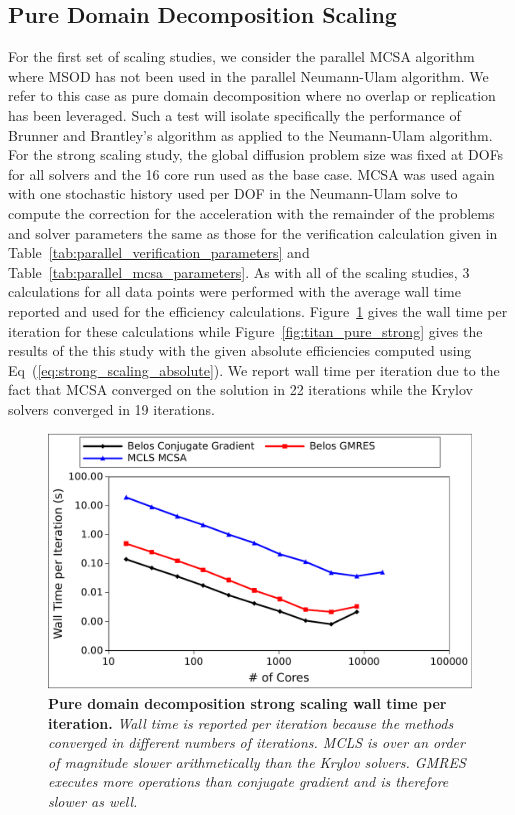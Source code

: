 \clearpage

\subsection{Pure Domain Decomposition Scaling}
\label{subsec:pure_domain_decomp}

For the first set of scaling studies, we consider the parallel MCSA
algorithm where MSOD has not been used in the parallel Neumann-Ulam
algorithm. We refer to this case as pure domain decomposition where no
overlap or replication has been leveraged. Such a test will isolate
specifically the performance of Brunner and Brantley's algorithm as
applied to the Neumann-Ulam algorithm. For the strong scaling study,
the global diffusion problem size was fixed at  DOFs for
all solvers and the 16 core run used as the base case. MCSA was used
again with one stochastic history used per DOF in the Neumann-Ulam
solve to compute the correction for the acceleration with the
remainder of the problems and solver parameters the same as those for
the verification calculation given in
Table~\ref{tab:parallel_verification_parameters} and
Table~\ref{tab:parallel_mcsa_parameters}. As with all of the scaling
studies, 3 calculations for all data points were performed with the
average wall time reported and used for the efficiency
calculations. Figure~\ref{fig:titan_pure_strong_time} gives the wall
time per iteration for these calculations while
Figure~\ref{fig:titan_pure_strong} gives the results of the this study
with the given absolute efficiencies computed using
Eq~(\ref{eq:strong_scaling_absolute}). We report wall time per
iteration due to the fact that MCSA converged on the solution in 22
iterations while the Krylov solvers converged in 19 iterations.

\begin{figure}[t!]
  \begin{center}
    \includegraphics[width=6in]{chapters/parallel_mc/titan_pure_strong_time.pdf}
  \end{center}
  \caption{\textbf{Pure domain decomposition strong scaling wall time
      per iteration.} \textit{Wall time is reported per iteration
      because the methods converged in different numbers of
      iterations. MCLS is over an order of magnitude slower
      arithmetically than the Krylov solvers. GMRES executes more
      operations than conjugate gradient and is therefore slower as
      well.}}
  \label{fig:titan_pure_strong_time}
\end{figure}

